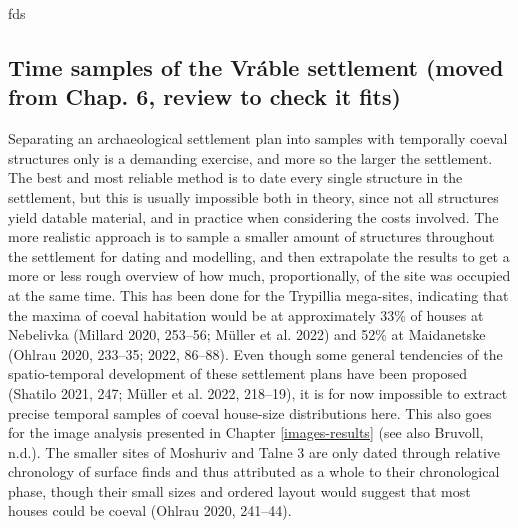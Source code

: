 \documentclass[
  12pt,
  a4paper, twoside]{book}
\begin{document}
fds

\hypertarget{time-samples-of-the-vruxe1ble-settlement-moved-from-chap.-6-review-to-check-it-fits}{%
\subsection{Time samples of the Vráble settlement (moved from Chap. 6, review to check it fits)}\label{time-samples-of-the-vruxe1ble-settlement-moved-from-chap.-6-review-to-check-it-fits}}

Separating an archaeological settlement plan into samples with temporally coeval structures only is a demanding exercise, and more so the larger the settlement. The best and most reliable method is to date every single structure in the settlement, but this is usually impossible both in theory, since not all structures yield datable material, and in practice when considering the costs involved. The more realistic approach is to sample a smaller amount of structures throughout the settlement for dating and modelling, and then extrapolate the results to get a more or less rough overview of how much, proportionally, of the site was occupied at the same time. This has been done for the Trypillia mega-sites, indicating that the maxima of coeval habitation would be at approximately 33\% of houses at Nebelivka (Millard 2020, 253--56; Müller et al. 2022) and 52\% at Maidanetske (Ohlrau 2020, 233--35; 2022, 86--88). Even though some general tendencies of the spatio-temporal development of these settlement plans have been proposed (Shatilo 2021, 247; Müller et al. 2022, 218--19), it is for now impossible to extract precise temporal samples of coeval house-size distributions here. This also goes for the image analysis presented in Chapter \ref{images-results} (see also Bruvoll, n.d.). The smaller sites of Moshuriv and Talne 3 are only dated through relative chronology of surface finds and thus attributed as a whole to their chronological phase, though their small sizes and ordered layout would suggest that most houses could be coeval (Ohlrau 2020, 241--44).
\end{document}
